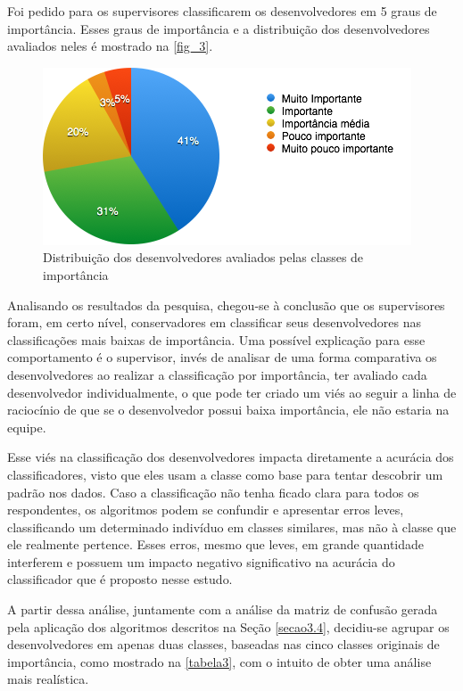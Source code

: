 Foi pedido para os supervisores classificarem os desenvolvedores em 5 graus de importância. Esses graus de importância e a distribuição dos desenvolvedores avaliados neles é mostrado na \autoref{fig_3}.

\begin{figure}[h]
	\centering
	\includegraphics[scale=0.8]{figs/geral/imagem-classe-original.png}
	\caption{\label{fig_3}Distribuição dos desenvolvedores avaliados pelas classes de importância}
\end{figure}

Analisando os resultados da pesquisa, chegou-se à conclusão que os supervisores foram, em certo nível, conservadores em classificar seus desenvolvedores nas classificações mais baixas de importância. Uma possível explicação para esse comportamento é o supervisor, invés de analisar de uma forma comparativa os desenvolvedores ao realizar a classificação por importância, ter avaliado cada desenvolvedor individualmente, o que pode ter criado um viés ao seguir a linha de raciocínio de que se o desenvolvedor possui baixa importância, ele não estaria na equipe.

Esse viés na classificação dos desenvolvedores impacta diretamente a acurácia dos classificadores, visto que eles usam a classe como base para tentar descobrir um padrão nos dados. Caso a classificação não tenha ficado clara para todos os respondentes, os algoritmos podem se confundir e apresentar erros leves, classificando um determinado indivíduo em classes similares, mas não à classe que ele realmente pertence. Esses erros, mesmo que leves, em grande quantidade interferem e possuem um impacto negativo significativo na acurácia do classificador que é proposto nesse estudo.

A partir dessa análise, juntamente com a análise da matriz de confusão gerada pela aplicação dos algoritmos descritos na Seção \ref{secao3.4}, decidiu-se agrupar os desenvolvedores em apenas duas classes, baseadas nas cinco classes originais de importância, como mostrado na \autoref{tabela3}, com o intuito de obter uma análise mais realística.


